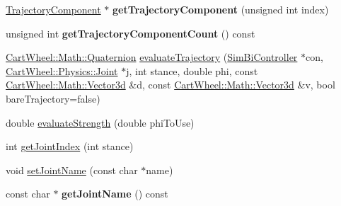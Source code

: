 \begin{DoxyCompactItemize}
\item 
\hypertarget{classCartWheel_1_1Core_1_1Trajectory_a4d36edeaabbc4ff1df40844ca0c2fe98}{
\hyperlink{classCartWheel_1_1Core_1_1TrajectoryComponent}{TrajectoryComponent} $\ast$ {\bfseries getTrajectoryComponent} (unsigned int index)}
\label{classCartWheel_1_1Core_1_1Trajectory_a4d36edeaabbc4ff1df40844ca0c2fe98}

\item 
\hypertarget{classCartWheel_1_1Core_1_1Trajectory_a6fb56ec9f7b1bf32be50eeb382d7c7a3}{
unsigned int {\bfseries getTrajectoryComponentCount} () const }
\label{classCartWheel_1_1Core_1_1Trajectory_a6fb56ec9f7b1bf32be50eeb382d7c7a3}

\item 
\hyperlink{classCartWheel_1_1Math_1_1Quaternion}{CartWheel::Math::Quaternion} \hyperlink{classCartWheel_1_1Core_1_1Trajectory_a90afd8e8c9b341ebb895e7fdd783bfbd}{evaluateTrajectory} (\hyperlink{classCartWheel_1_1Core_1_1SimBiController}{SimBiController} $\ast$con, \hyperlink{classCartWheel_1_1Physics_1_1Joint}{CartWheel::Physics::Joint} $\ast$j, int stance, double phi, const \hyperlink{classCartWheel_1_1Math_1_1Vector3d}{CartWheel::Math::Vector3d} \&d, const \hyperlink{classCartWheel_1_1Math_1_1Vector3d}{CartWheel::Math::Vector3d} \&v, bool bareTrajectory=false)
\item 
double \hyperlink{classCartWheel_1_1Core_1_1Trajectory_a18b33b11d97d6bc9be5860779232769b}{evaluateStrength} (double phiToUse)
\item 
int \hyperlink{classCartWheel_1_1Core_1_1Trajectory_a76eaf0a8f08de66c1524b4d515c34c7a}{getJointIndex} (int stance)
\item 
void \hyperlink{classCartWheel_1_1Core_1_1Trajectory_afe7f573f2fd012d473bd87e7781bd1ef}{setJointName} (const char $\ast$name)
\item 
\hypertarget{classCartWheel_1_1Core_1_1Trajectory_a10140d032ebd3106d350c269953f18f6}{
const char $\ast$ {\bfseries getJointName} () const }
\label{classCartWheel_1_1Core_1_1Trajectory_a10140d032ebd3106d350c269953f18f6}


\end{DoxyCompactItemize}
